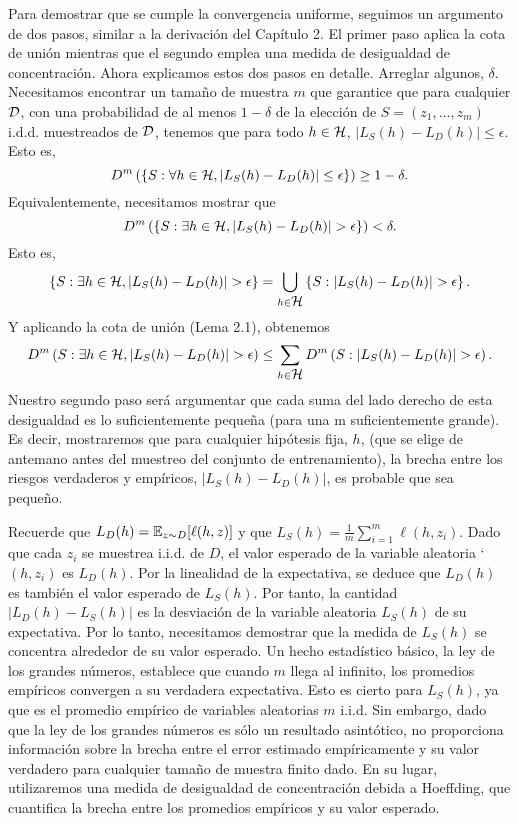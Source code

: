 Para demostrar que se cumple la convergencia uniforme, seguimos un argumento de dos pasos, similar a la derivación del Capítulo 2. El primer paso aplica la cota de unión mientras que el segundo emplea una medida de desigualdad de concentración. Ahora explicamos estos dos pasos en detalle. Arreglar algunos, $\delta$. Necesitamos encontrar un tamaño de muestra $m$ que garantice que para cualquier $\mathop{\mbox{$\mathcal{D}$}}\nolimits$, con una probabilidad de al menos $1 -\delta$ de la elección de $S = (z_1, \ldots , z_m)$ i.d.d. muestreados de $\mathop{\mbox{$\mathcal{D}$}}\nolimits$, tenemos que para todo $h\in \mathop{\mbox{$\mathcal{H}$}}\nolimits$, $|L_S(h) - L_D(h)| \leq \epsilon$. Esto es,
$$D^m\left(\left\{S:\forall h \in \mathop{\mbox{$\mathcal{H}$}}\nolimits, |L_S(h)-L_D(h)|\leq \epsilon\right\}\right)\geq 1-\delta.$$
Equivalentemente, necesitamos mostrar que
$$D^m\left(\left\{S:\exists h \in \mathop{\mbox{$\mathcal{H}$}}\nolimits, |L_S(h)-L_D(h)| > \epsilon\right\}\right) < \delta.$$
Esto es,
$$\left\{S: \exists h\in \mathop{\mbox{$\mathcal{H}$}}\nolimits, |L_S(h)-L_D(h)| > \epsilon\right\} = \bigcup_{h\in \mathop{\mbox{$\mathcal{H}$}}\nolimits}\left\{S: |L_S(h)-L_D(h)| > \epsilon\right\}.$$
Y aplicando la cota de unión (Lema 2.1), obtenemos
\begin{equation}
    D^m\left(S:\exists h \in \mathop{\mbox{$\mathcal{H}$}}\nolimits, |L_S(h)-L_D(h)| > \epsilon\right) \leq \sum_{h\in \mathop{\mbox{$\mathcal{H}$}}\nolimits}D^m\left(S:|L_S(h)-L_D(h)| > \epsilon\right).
\end{equation}
Nuestro segundo paso será argumentar que cada suma del lado derecho de esta desigualdad es lo suficientemente pequeña (para una m suficientemente grande). Es decir, mostraremos que para cualquier hipótesis fija, $h$, (que se elige de antemano antes del muestreo del conjunto de entrenamiento), la brecha entre los riesgos verdaderos y empíricos, $|L_S(h) - L_D(h)|$, es probable que sea pequeño.

Recuerde que $L_D(h) = \mathop{\mbox{$\mathbb{E}$}}\nolimits_{z\sim D}[\ell(h, z)]$ y que $L_S(h) = \frac{1}{m} \sum_{i=1}^m \ell(h, z_i)$. Dado que cada $z_i$ se muestrea i.i.d. de $D$, el valor esperado de la variable aleatoria `$(h, z_i)$ es $L_D(h)$. Por la linealidad de la expectativa, se deduce que $L_D(h)$ es también el valor esperado de $L_S(h)$. Por tanto, la cantidad $|L_D(h)-L_S(h)|$ es la desviación de la variable aleatoria $L_S(h)$ de su expectativa. Por lo tanto, necesitamos demostrar que la medida de $L_S(h)$ se concentra alrededor de su valor esperado. Un hecho estadístico básico, la ley de los grandes números, establece que cuando $m$ llega al infinito, los promedios empíricos convergen a su verdadera expectativa. Esto es cierto para $L_S(h)$, ya que es el promedio empírico de variables aleatorias $m$ i.i.d. Sin embargo, dado que la ley de los grandes números es sólo un resultado asintótico, no proporciona información sobre la brecha entre el error estimado empíricamente y su valor verdadero para cualquier tamaño de muestra finito dado. En su lugar, utilizaremos una medida de desigualdad de concentración debida a Hoeffding, que cuantifica la brecha entre los promedios empíricos y su valor esperado.\\

